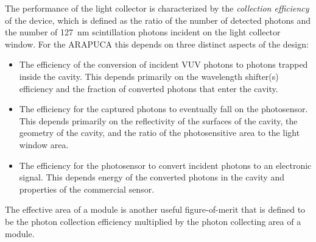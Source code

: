 The performance of the light collector is characterized by the \emph{collection efficiency} of the device, which is defined as the ratio of the number of detected photons and the number of \SI{127}{nm} scintillation photons incident on the light collector window.  For the ARAPUCA this depends on three distinct aspects of the design:
\begin{itemize}
    \item The efficiency of the conversion of incident VUV photons to photons trapped inside the cavity. This depends primarily on the wavelength shifter(s) efficiency and the fraction of converted photons that enter the cavity.
    \item The efficiency for the captured photons to eventually fall on the photosensor. This depends primarily on the reflectivity of the surfaces of the cavity, the geometry of the cavity, and the ratio of the photosensitive area to the light window area.
    \item The efficiency for the photosensor to convert incident photons to an electronic signal. This depends energy of the converted photons in the cavity and properties of the commercial sensor.
\end{itemize}
The effective area of a  module is another useful figure-of-merit that is defined to be the photon collection efficiency multiplied by the photon collecting area of a  module. 




